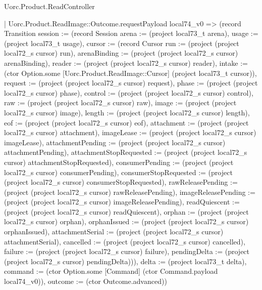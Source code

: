 \begin{lexlean}{Uorc.Product.ReadController}
\begin{semanticmodule}
{    | Uorc.Product.ReadImage::Outcome.requestPayload local74_v0 => (record Transition {session := (record Session {arena := (project local73_t arena), usage := (project local73_t usage), cursor := (record Cursor {run := (project (project local72_s cursor) run), arenaBinding := (project (project local72_s cursor) arenaBinding), reader := (project (project local72_s cursor) reader), intake := (ctor Option.some [Uorc.Product.ReadImage::Cursor] (project local73_t cursor)), request := (project (project local72_s cursor) request), phase := (project (project local72_s cursor) phase), control := (project (project local72_s cursor) control), raw := (project (project local72_s cursor) raw), image := (project (project local72_s cursor) image), length := (project (project local72_s cursor) length), eof := (project (project local72_s cursor) eof), attachment := (project (project local72_s cursor) attachment), imageLease := (project (project local72_s cursor) imageLease), attachmentPending := (project (project local72_s cursor) attachmentPending), attachmentStopRequested := (project (project local72_s cursor) attachmentStopRequested), consumerPending := (project (project local72_s cursor) consumerPending), consumerStopRequested := (project (project local72_s cursor) consumerStopRequested), rawReleasePending := (project (project local72_s cursor) rawReleasePending), imageReleasePending := (project (project local72_s cursor) imageReleasePending), readQuiescent := (project (project local72_s cursor) readQuiescent), orphan := (project (project local72_s cursor) orphan), orphanIssued := (project (project local72_s cursor) orphanIssued), attachmentSerial := (project (project local72_s cursor) attachmentSerial), cancelled := (project (project local72_s cursor) cancelled), failure := (project (project local72_s cursor) failure), pendingDelta := (project (project local72_s cursor) pendingDelta)})}), delta := (project local73_t delta), command := (ctor Option.some [Command] (ctor Command.payload local74_v0)), outcome := (ctor Outcome.advanced)})
}
\end{semanticmodule}
\end{lexlean}
